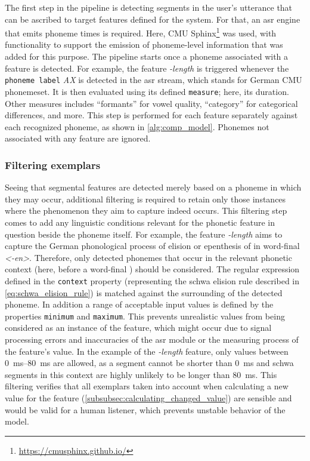 The first step in the pipeline is detecting segments in the user's utterance that can be ascribed to target features defined for the system.
For that, an \ac{asr} engine that emits phoneme times is required.
Here, CMU Sphinx\footnote{\url{https://cmusphinx.github.io/}} was used, with functionality to support the emission of phoneme-level information that was added for this purpose.
The pipeline starts once a phoneme associated with a feature is detected.
For example, the feature \emph{-length} is triggered whenever the \texttt{phoneme label} \emph{AX} is detected in the \ac{asr} stream, which stands for \textipa{[@]} German CMU phonemeset.
It is then evaluated using its defined \texttt{measure}; here, its duration.
Other measures includes \enquote{formants} for vowel quality, \enquote{category} for categorical differences, and more.
This step is performed for each feature separately against each recognized phoneme, as shown in \cref{alg:comp_model}.
Phonemes not associated with any feature are ignored.

\subsubsection{Filtering exemplars}
\label{subsubsec:filtering_exemplars}

Seeing that segmental features are detected merely based on a phoneme in which they may occur, additional filtering is required to retain only those instances where the phenomenon they aim to capture indeed occurs.
This filtering step comes to add any linguistic conditions relevant for the phonetic feature in question beside the phoneme itself.
For example, the feature \emph{-length} aims to capture the German phonological process of elision or epenthesis of  in word-final \emph{<-en>}.
Therefore, only detected phonemes that occur in the relevant phonetic context (here, before a word-final ) should be considered.
The regular expression defined in the \texttt{context} property (representing the schwa elision rule described in \cref{eq:schwa_elision_rule}) is matched against the surrounding of the detected phoneme.
In addition a range of acceptable input values is defined by the properties \texttt{minimum} and \texttt{maximum}.
This prevents unrealistic values from being considered as an instance of the feature, which might occur due to signal processing errors and inaccuracies of the \ac{asr} module or the measuring process of the feature's value.
In the example of the \emph{-length} feature, only values between \SIrange{0}{80}{\milli\second}  are allowed, as a segment cannot be shorter than \SI{0}{\milli\second} and schwa segments in this context are highly unlikely to be longer than \SI{80}{\milli\second}.
This filtering verifies that all exemplars taken into account when calculating a new value for the feature (\cref{subsubsec:calculating_changed_value}) are sensible and would be valid for a human listener, which prevents unstable behavior of the model.

